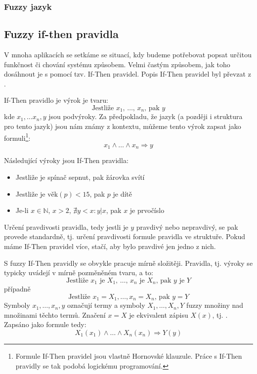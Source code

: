 \documentclass[a4paper,10pt]{article}
\begin{document}
\subsubsection*{Fuzzy jazyk}
 


\subsection{}


\subsection{Fuzzy if-then pravidla}
V mnoha aplikacích se setkáme se situací, kdy budeme potřebovat popsat určitou funkčnost či chování systému  způsobem. Velmi častým způsobem, jak toho dosáhnout je s pomocí tzv. If-Then pravidel. Popis If-Then pravidel byl převzat z \cite{RuaKer-FuzIfTheRulComI}.

If-Then pravidlo je výrok je tvaru:
$$
 \text{Jestliže $x_1$, $\dots$, $x_n$, pak $y$}
$$
kde $x_1, \dots x_n, y$ jsou podvýroky. Za předpokladu, že jazyk (a později i struktura pro tento jazyk) jsou nám známy z kontextu, můžeme tento výrok zapsat jako formuli\footnote{Formule If-Then pravidel jsou vlastně Hornovské klauzule. Práce s If-Then pravidly se tak podobá logickému programování.}:
$$
 x_1 \wedge \dots \wedge x_n \Rightarrow y
$$

\begin{example}
 Následující výroky jsou If-Then pravidla:
 \begin{itemize}
  \item Jestliže je spínač sepnut, pak žárovka svítí
  \item Jestliže je $\text{věk}(p) < 15$, pak $p$ je dítě
  \item Je-li $x \in \mathbb{N}$, $x > 2$, $\nexists y < x: y|x$, pak $x$ je prvočíslo
 \end{itemize}
\end{example}

Určení pravdivosti pravidla, tedy jestli je $y$ pravdivý nebo nepravdivý, se pak provede standardně, tj. určení pravdivosti formule pravidla ve struktuře. Pokud máme If-Then pravidel více, stačí, aby bylo pravdivé jen jedno z nich.

S fuzzy If-Then pravidly se obvykle pracuje mírně složitěji. Pravidla, tj. výroky se typicky uvádejí v mírně pozměněném tvaru, a to:
$$
 \text{Jestliže $x_1$ je $X_1$, $\dots$, $x_n$ je $X_n$, pak $y$ je $Y$}
$$
případně
$$
 \text{Jestliže $x_1 = X_1, \dots, x_n = X_n$, pak $y = Y$}
$$
Symboly $x_1, \dots, x_n, y$ označují termy a symboly $X_1, \dots, X_n, Y$ fuzzy množiny nad množinami těchto termů. Značení $x = X$ je ekvivalent zápisu $X(x)$, tj. . Zapsáno jako formule tedy:
$$
 X_1(x_1) \wedge \dots \wedge X_n(x_n) \Rightarrow Y(y)
$$
\end{document}
